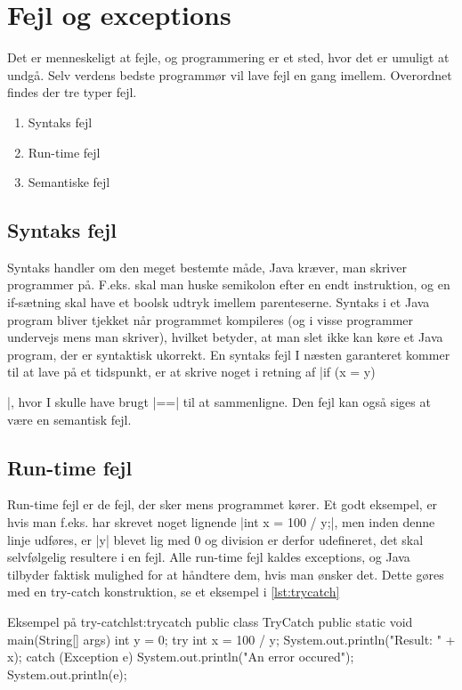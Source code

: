 {\section{Fejl og exceptions}
Det er menneskeligt at fejle, og programmering er et sted, hvor det er umuligt at undgå. Selv verdens bedste programmør vil lave fejl en gang imellem. Overordnet findes der tre typer fejl.

\begin{enumerate}
	\item Syntaks fejl
	\item Run-time fejl
	\item Semantiske fejl
\end{enumerate}

\subsection{Syntaks fejl}
Syntaks handler om den meget bestemte måde, Java kræver, man skriver programmer på. F.eks. skal man huske semikolon efter en endt instruktion, og en if-sætning skal have et boolsk udtryk imellem parenteserne. Syntaks i et Java program bliver tjekket når programmet kompileres (og i visse programmer undervejs mens man skriver), hvilket betyder, at man slet ikke kan køre et Java program, der er syntaktisk ukorrekt. En syntaks fejl I næsten garanteret kommer til at lave på et tidspunkt, er at skrive noget i retning af \JavaInline|if (x = y) {|, hvor I skulle have brugt \JavaInline|==| til at sammenligne. Den fejl kan også siges at være en semantisk fejl.

\subsection{Run-time fejl}
Run-time fejl er de fejl, der sker mens programmet kører. Et godt eksempel, er hvis man f.eks. har skrevet noget lignende \JavaInline|int x = 100 / y;|, men inden denne linje udføres, er \JavaInline|y| blevet lig med 0 og division er derfor udefineret, det skal selvfølgelig resultere i en fejl. Alle run-time fejl kaldes exceptions, og Java tilbyder faktisk mulighed for at håndtere dem, hvis man ønsker det. Dette gøres med en try-catch konstruktion, se et eksempel i \autoref{lst:trycatch}

\begin{JavaCode}{Eksempel på try-catch}{lst:trycatch}
	public class TryCatch {
		public static void main(String[] args) {
			int y = 0;
			try {
				int x = 100 / y;
				System.out.println("Result: " + x); 
			} catch (Exception e) {
				System.out.println("An error occured");
				System.out.println(e);
			}
		}
	}
	

\end{JavaCode}}}
